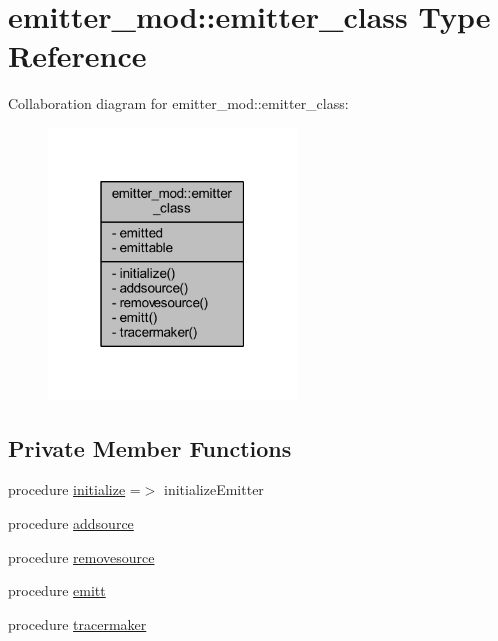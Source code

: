 \hypertarget{structemitter__mod_1_1emitter__class}{}\section{emitter\+\_\+mod\+:\+:emitter\+\_\+class Type Reference}
\label{structemitter__mod_1_1emitter__class}


Collaboration diagram for emitter\+\_\+mod\+:\+:emitter\+\_\+class\+:
\nopagebreak
\begin{figure}[H]
\begin{center}
\leavevmode
\includegraphics[width=187pt]{structemitter__mod_1_1emitter__class__coll__graph}
\end{center}
\end{figure}
\subsection*{Private Member Functions}
\begin{DoxyCompactItemize}
\item 
procedure \mbox{\hyperlink{structemitter__mod_1_1emitter__class_acd215b2680677e298267c5940f0cf79b}{initialize}} =$>$ initialize\+Emitter
\item 
procedure \mbox{\hyperlink{structemitter__mod_1_1emitter__class_a162685b7b0bf96b555fee37e129c9783}{addsource}}
\item 
procedure \mbox{\hyperlink{structemitter__mod_1_1emitter__class_a277317a5cca4d7679d0e77edd350ef79}{removesource}}
\item 
procedure \mbox{\hyperlink{structemitter__mod_1_1emitter__class_ac33721448c01508a8e8c486cd7a76b65}{emitt}}
\item 
procedure \mbox{\hyperlink{structemitter__mod_1_1emitter__class_a35d90033d453c725390c4532cc8231f7}{tracermaker}}
\end{DoxyCompactItemize}

